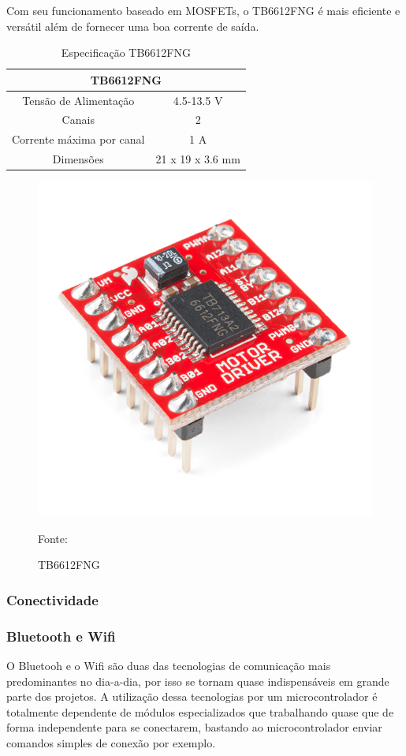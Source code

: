 Com seu funcionamento baseado em MOSFETs, o TB6612FNG é mais eficiente e versátil além de fornecer uma boa corrente de saída.

\begin{table}[h!]
\centering
\begin{tabular}{|c|c|}
\hline
\multicolumn{2}{|c|}{TB6612FNG}                                         \\ \hline
Tensão de Alimentação           & 4.5-13.5 V		\\ \hline
Canais                          & 2          		\\ \hline
Corrente máxima por canal       & 1 A        		\\ \hline
Dimensões 						& 21 x 19 x 3.6 mm 	\\ \hline
\end{tabular}
\caption{Especificação TB6612FNG}
\label{tab:duplo}
\end{table}

\begin{figure}[h!]
  \centering
    \includegraphics[width=.3\textwidth]{figuras/duplo.jpg}
    \caption{TB6612FNG} Fonte: \cite{Sparkfun2019}
    \label{fig:duplo}
\end{figure}

\subsubsection{Conectividade}

\subsubsection*{Bluetooth e Wifi}

O Bluetooh e o Wifi são duas das tecnologias de comunicação mais predominantes no dia-a-dia, por isso se tornam quase indispensáveis em grande parte dos projetos. A utilização dessa tecnologias por um microcontrolador é totalmente dependente de módulos especializados que trabalhando quase que de forma independente para se conectarem, bastando ao microcontrolador enviar comandos simples de conexão por exemplo.

